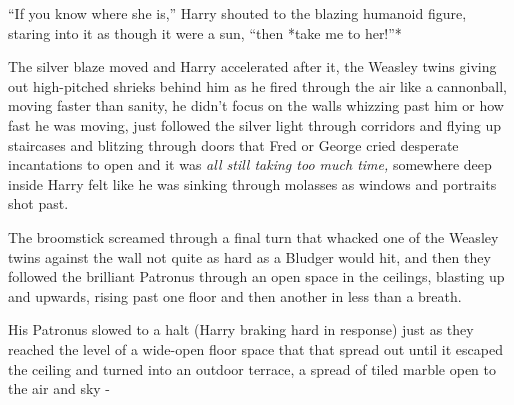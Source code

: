 ``If you know where she is,'' Harry shouted to the blazing humanoid
figure, staring into it as though it were a sun, ``then *take me to
her!''*

The silver blaze moved and Harry accelerated after it, the Weasley twins
giving out high-pitched shrieks behind him as he fired through the air
like a cannonball, moving faster than sanity, he didn't focus on the
walls whizzing past him or how fast he was moving, just followed the
silver light through corridors and flying up staircases and blitzing
through doors that Fred or George cried desperate incantations to open
and it was \emph{all still taking too much time,} somewhere deep inside
Harry felt like he was sinking through molasses as windows and portraits
shot past.

The broomstick screamed through a final turn that whacked one of the
Weasley twins against the wall not quite as hard as a Bludger would hit,
and then they followed the brilliant Patronus through an open space in
the ceilings, blasting up and upwards, rising past one floor and then
another in less than a breath.

His Patronus slowed to a halt (Harry braking hard in response) just as
they reached the level of a wide-open floor space that that spread out
until it escaped the ceiling and turned into an outdoor terrace, a
spread of tiled marble open to the air and sky -

